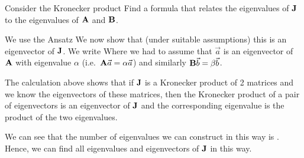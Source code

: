Consider the Kronecker product
Find a formula that relates the eigenvalues of $\bf J$ to the eigenvalues of $\bf A$ and $\bf B$. 

\solution
We use the Ansatz 
We now show that (under suitable assumptions) this is an eigenvector of $\bf J$. We write
Where we had to assume that $\vec{a}$ is an eigenvector of $\bf A$ with eigenvalue $\alpha$ (i.e.~${\bf A}\vec{a}=\alpha \vec{a}$) and similarly ${\bf B}\vec{b}=\beta \vec{b}$.

The calculation above shows that if $\bf J$ is a Kronecker product of 2 matrices and we know the eigenvectors of these matrices, then the Kronecker product of a pair of eigenvectors is an eigenvector of $\bf J$ and the corresponding eigenvalue is the product of the two eigenvalues. 

We can see that the number of eigenvalues we can construct in this way is 
.
Hence, we can find all eigenvalues and eigenvectors of $\bf J$ in this way.
